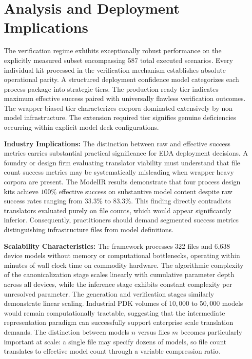 \documentclass[10pt,twocolumn]{article}
\begin{document}
\section{Analysis and Deployment Implications}
The verification regime exhibits exceptionally robust performance on the explicitly measured subset encompassing 587 total executed scenarios. Every individual kit processed in the verification mechanism establishes absolute operational parity. A structured deployment confidence model categorizes each process package into strategic tiers. The production ready tier indicates maximum effective success paired with universally flawless verification outcomes. The wrapper biased tier characterizes corpora dominated extensively by non model infrastructure. The extension required tier signifies genuine deficiencies occurring within explicit model deck configurations. 

\textbf{Industry Implications:} The distinction between raw and effective success metrics carries substantial practical significance for EDA deployment decisions. A foundry or design firm evaluating translator viability must understand that file count success metrics may be systematically misleading when wrapper heavy corpora are present. The ModelIR results demonstrate that four process design kits achieve $100\%$ effective success on substantive model content despite raw success rates ranging from $33.3\%$ to $83.3\%$. This finding directly contradicts translators evaluated purely on file counts, which would appear significantly inferior. Consequently, practitioners should demand segmented success metrics distinguishing infrastructure files from model definitions.

\textbf{Scalability Characteristics:} The framework processes 322 files and 6,638 device models without memory or computational bottlenecks, operating within minutes of wall clock time on commodity hardware. The algorithmic complexity of the canonicalization stage scales linearly with cumulative parameter depth across all devices, while the inference stage exhibits constant complexity per unresolved parameter. The generation and verification stages similarly demonstrate linear scaling. Industrial PDK volumes of $10,000$ to $50,000$ models would remain computationally tractable, suggesting that the intermediate representation paradigm can successfully support enterprise scale translation demands. The distinction between models $n$ versus files $m$ becomes particularly important at scale: a single file may specify dozens of models, so file count translates to effective model count through a variable compression ratio.
\end{document}
